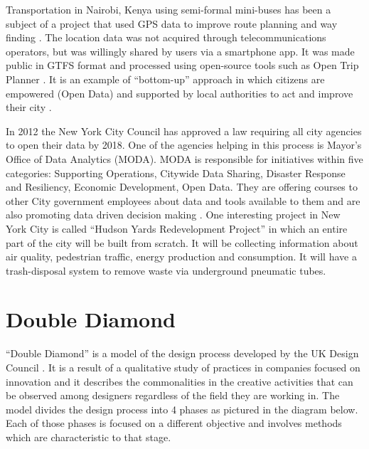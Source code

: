 Transportation in Nairobi, Kenya using semi-formal mini-buses has been a subject of a project that used GPS data to improve route planning and way finding \citep{klopp2015leveraging}. The location data was not acquired through telecommunications operators, but was willingly shared by users via a smartphone app. It was made public in GTFS format and processed using open-source tools such as Open Trip Planner \citep{klopp2015leveraging}. It is an example of “bottom-up” approach in which citizens are empowered (Open Data) and supported by local authorities to act and improve their city \citep{Neirotti2014}.

In 2012 the New York City Council has approved a law requiring all city agencies to open their data by 2018. One of the agencies helping in this process is Mayor’s Office of Data Analytics (MODA). MODA is responsible for initiatives within five categories: Supporting Operations, Citywide Data Sharing, Disaster Response and Resiliency, Economic Development, Open Data. They are offering courses to other City government employees about data and tools available to them and are also promoting data driven decision making \citep{NYCMODA2014}. One interesting project in New York City is called “Hudson Yards Redevelopment Project” in which an entire part of the city will be built from scratch. It will be collecting information about air quality, pedestrian traffic, energy production and consumption. It will have a trash-disposal system to remove waste via underground pneumatic tubes.

	\section{Double Diamond}
	
“Double Diamond” is a model of the design process developed by the UK Design Council \citep{council2007eleven, council2005double}. It is a result of a qualitative study of practices in companies focused on innovation and it describes the commonalities in the creative activities that can be observed among designers regardless of the field they are working in. The model divides the design process into 4 phases as pictured in the diagram below. Each of those phases is focused on a different objective and involves methods which are characteristic to that stage.